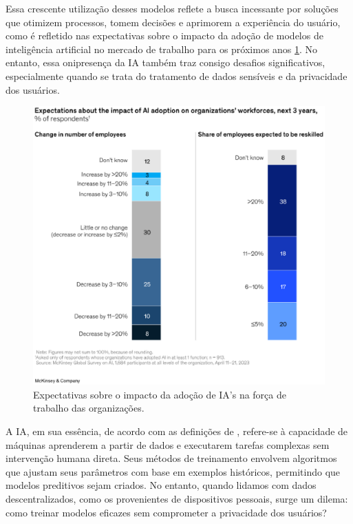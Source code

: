 Essa crescente utilização desses modelos reflete a busca incessante por soluções que otimizem processos, tomem decisões e aprimorem a experiência do usuário, como é refletido nas expectativas sobre o impacto da adoção de modelos de inteligência artificial no mercado de trabalho para os próximos anos \ref{fig:capacidadeIA}. No entanto, essa onipresença da IA também traz consigo desafios significativos, especialmente quando se trata do tratamento de dados sensíveis e da privacidade dos usuários.

\begin{figure}[h]
    \centering
    \includegraphics[scale = 0.8]{figuras/ExpectationsAboutImpact.eps}
    \caption{Expectativas sobre o impacto da adoção de IA's na força de trabalho das organizações.}
    \label{fig:capacidadeIA}
\end{figure}

A IA, em sua essência, de acordo com as definições de \cite{russel}, refere-se à capacidade de máquinas aprenderem a partir de dados e executarem tarefas complexas sem intervenção humana direta. Seus métodos de treinamento envolvem algoritmos que ajustam seus parâmetros com base em exemplos históricos, permitindo que modelos preditivos sejam criados. No entanto, quando lidamos com dados descentralizados, como os provenientes de dispositivos pessoais, surge um dilema: como treinar modelos eficazes sem comprometer a privacidade dos usuários?

